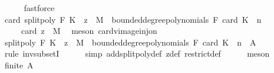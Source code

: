 \begin{isabellebody}
\ \ \ \ \isamarkupfalse%
\ fastforce\isanewline
\ \ \isamarkupfalse%
\ \isamarkupfalse%
\ {\isachardoublequoteopen}card\ {\isacharparenleft}{\kern0pt}{\isacharparenleft}{\kern0pt}split{\isacharunderscore}{\kern0pt}poly\ F\ K\ {\isacharminus}{\kern0pt}{\isacharbackquote}{\kern0pt}\ {\isacharparenleft}{\kern0pt}{\isacharbraceleft}{\kern0pt}z{\isacharbraceright}{\kern0pt}\ {\isasymtimes}\ M{\isacharparenright}{\kern0pt}{\isacharparenright}{\kern0pt}\ {\isasyminter}\ bounded{\isacharunderscore}{\kern0pt}degree{\isacharunderscore}{\kern0pt}polynomials\ F\ {\isacharparenleft}{\kern0pt}card\ K\ {\isacharplus}{\kern0pt}\ n{\isacharparenright}{\kern0pt}{\isacharparenright}{\kern0pt}\isanewline
\ \ \ \ {\isacharequal}{\kern0pt}\ card\ {\isacharparenleft}{\kern0pt}{\isacharbraceleft}{\kern0pt}z{\isacharbraceright}{\kern0pt}\ {\isasymtimes}\ M{\isacharparenright}{\kern0pt}{\isachardoublequoteclose}\ \isamarkupfalse%
\ {\isacharparenleft}{\kern0pt}meson\ card{\isacharunderscore}{\kern0pt}vimage{\isacharunderscore}{\kern0pt}inj{\isacharunderscore}{\kern0pt}on{\isacharparenright}{\kern0pt}\isanewline
\ \ \isamarkupfalse%
\ \isamarkupfalse%
\ {\isachardoublequoteopen}{\isacharparenleft}{\kern0pt}split{\isacharunderscore}{\kern0pt}poly\ F\ K\ {\isacharminus}{\kern0pt}{\isacharbackquote}{\kern0pt}\ {\isacharparenleft}{\kern0pt}{\isacharbraceleft}{\kern0pt}z{\isacharbraceright}{\kern0pt}\ {\isasymtimes}\ M{\isacharparenright}{\kern0pt}{\isacharparenright}{\kern0pt}\ {\isasyminter}\ bounded{\isacharunderscore}{\kern0pt}degree{\isacharunderscore}{\kern0pt}polynomials\ F\ {\isacharparenleft}{\kern0pt}card\ K\ {\isacharplus}{\kern0pt}\ n{\isacharparenright}{\kern0pt}\ {\isasymsubseteq}\ {\isacharquery}{\kern0pt}A{\isachardoublequoteclose}\isanewline
\ \ \ \ \isamarkupfalse%
\ {\isacharparenleft}{\kern0pt}rule\ inv{\isacharunderscore}{\kern0pt}subsetI{\isacharparenright}{\kern0pt}\isanewline
\ \ \ \ \isamarkupfalse%
\ {\isacharparenleft}{\kern0pt}simp\ add{\isacharcolon}{\kern0pt}split{\isacharunderscore}{\kern0pt}poly{\isacharunderscore}{\kern0pt}def\ z{\isacharunderscore}{\kern0pt}def\ restrict{\isacharunderscore}{\kern0pt}def{\isacharparenright}{\kern0pt}\isanewline
\ \ \ \ \isamarkupfalse%
\ {\isacharparenleft}{\kern0pt}meson{\isacharparenright}{\kern0pt}\isanewline
\ \ \isamarkupfalse%
\ \isamarkupfalse%
\ {\isachardoublequoteopen}finite\ {\isacharquery}{\kern0pt}A{\isachardoublequoteclose}\ \isamarkupfalse%

\end{isabellebody}
